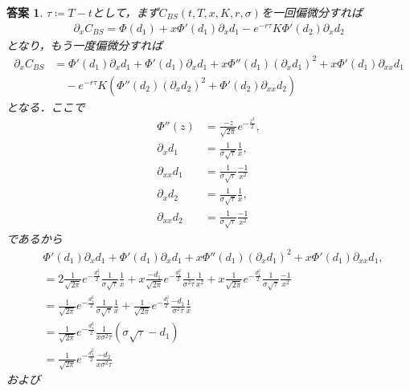 \documentclass[11pt,a4paper]{jsarticle}
\theoremstyle{mystyle}
\newtheorem*{ans}{答案}
\begin{document}
\begin{ans}
	$\tau \coloneqq T - t$として，まず$C_{BS}(t,T,x,K,r,\sigma)$を一回偏微分すれば
	\begin{align}
		\partial_{x}C_{BS} = \Phi(d_{1}) + x \Phi'(d_{1}) \partial_{x}d_{1}
		- e^{-r\tau}K\Phi'(d_{2})\partial_{x}d_{2} 
	\end{align}
	となり，もう一度偏微分すれば
	\begin{align}
		\partial_{x}C_{BS} &= \Phi'(d_{1})\partial_{x}d_{1} 
		+ \Phi'(d_{1}) \partial_{x}d_{1} + x \Phi''(d_{1}) (\partial_{x} d_{1})^{2}
		+ x \Phi'(d_{1}) \partial_{xx} d_{1} \\
		&\quad - e^{-r\tau}K\left(\Phi''(d_{2})(\partial_{x}d_{2})^{2}
		+ \Phi'(d_{2})\partial_{xx}d_{2}\right)
		\label{formula:4_1}
	\end{align}
	となる．ここで
	\begin{align}
		\Phi''(z) &= \frac{-z}{\sqrt{2\pi}}e^{-\frac{z^{2}}{2}}, \\
		\partial_{x} d_{1} &= \frac{1}{\sigma\sqrt{\tau}} \frac{1}{x}, \\
		\partial_{xx} d_{1} &= \frac{1}{\sigma\sqrt{\tau}} \frac{-1}{x^{2}} \\
		\partial_{x} d_{2} &= \frac{1}{\sigma\sqrt{\tau}} \frac{1}{x}, \\
		\partial_{xx} d_{2} &= \frac{1}{\sigma\sqrt{\tau}} \frac{-1}{x^{2}}
	\end{align}
	であるから
	\begin{align}
		&\Phi'(d_{1})\partial_{x}d_{1} 
		+ \Phi'(d_{1}) \partial_{x}d_{1} + x \Phi''(d_{1}) (\partial_{x} d_{1})^{2}
		+ x \Phi'(d_{1}) \partial_{xx} d_{1}, \\
		&= 2\frac{1}{\sqrt{2\pi}}e^{-\frac{d_{1}^{2}}{2}} \frac{1}{\sigma\sqrt{\tau}}\frac{1}{x} 
		+ x\frac{-d_{1}}{\sqrt{2\pi}}e^{-\frac{d_{1}^{2}}{2}} 
		\frac{1}{\sigma^{2}\tau}\frac{1}{x^{2}}
		+ x\frac{1}{\sqrt{2\pi}}e^{-\frac{d_{1}^{2}}{2}} \frac{1}{\sigma\sqrt{\tau}}\frac{-1}{x^{2}} \\
		&= \frac{1}{\sqrt{2\pi}}e^{-\frac{d_{1}^{2}}{2}} \frac{1}{\sigma\sqrt{\tau}}\frac{1}{x} 
		+ \frac{1}{\sqrt{2\pi}}e^{-\frac{d_{1}^{2}}{2}} \frac{-d_{1}}{\sigma^{2}\tau} \frac{1}{x} \\
		&= \frac{1}{\sqrt{2\pi}}e^{-\frac{d_{1}^{2}}{2}} \frac{1}{x\sigma^{2}\tau}
		(\sigma \sqrt{\tau} - d_{1}) \\
		&= \frac{1}{\sqrt{2\pi}}e^{-\frac{d_{1}^{2}}{2}} \frac{-d_{2}}{x\sigma^{2}\tau}
	\end{align}
	および
	\begin{align}

\end{align}
\end{ans}
\end{document}
